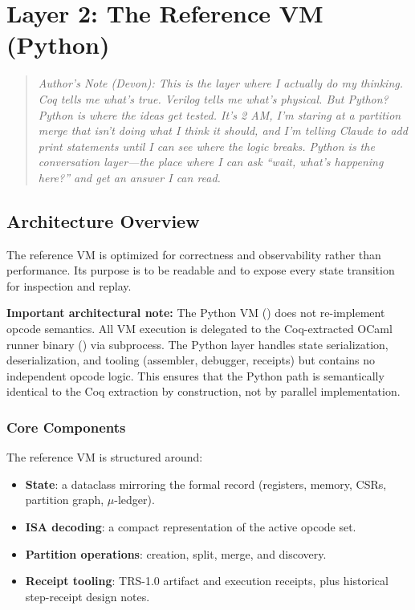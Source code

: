 \section{Layer 2: The Reference VM (Python)}

\begin{quote}
\textit{Author's Note (Devon): This is the layer where I actually do my thinking. Coq tells me what's true. Verilog tells me what's physical. But Python? Python is where the ideas get tested. It's 2 AM, I'm staring at a partition merge that isn't doing what I think it should, and I'm telling Claude to add print statements until I can see where the logic breaks. Python is the conversation layer---the place where I can ask ``wait, what's happening here?'' and get an answer I can read.}
\end{quote}

\subsection{Architecture Overview}

The reference VM is optimized for correctness and observability rather than performance. Its purpose is to be readable and to expose every state transition for inspection and replay.

\textbf{Important architectural note:} The Python VM () does not re-implement opcode semantics. All VM execution is delegated to the Coq-extracted OCaml runner binary () via subprocess. The Python layer handles state serialization, deserialization, and tooling (assembler, debugger, receipts) but contains no independent opcode logic. This ensures that the Python path is semantically identical to the Coq extraction by construction, not by parallel implementation.

\subsubsection{Core Components}

The reference VM is structured around:
\begin{itemize}
    \item \textbf{State}: a dataclass mirroring the formal record (registers, memory, CSRs, partition graph, $\mu$-ledger).
    \item \textbf{ISA decoding}: a compact representation of the active opcode set.
    \item \textbf{Partition operations}: creation, split, merge, and discovery.
    \item \textbf{Receipt tooling}: TRS-1.0 artifact and execution receipts, plus historical step-receipt design notes.
\end{itemize}

